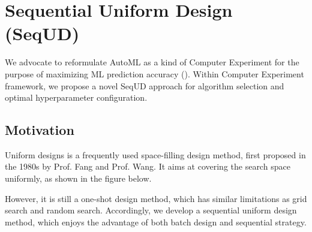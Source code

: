 \documentclass[letterpaper,10pt,english]{sphinxmanual}
\begin{document}
\begin{sphinxVerbatim}[commandchars=\\\{\}]
  
   
    

                    
 
\end{sphinxVerbatim}


\section{Sequential Uniform Design (SeqUD)}
\label{\detokenize{pysequd:sequential-uniform-design-sequd}}\label{\detokenize{pysequd::doc}}
We advocate to reformulate AutoML as a kind of Computer Experiment for the purpose of maximizing ML prediction accuracy ().
Within Computer Experiment framework, we propose a novel SeqUD approach for algorithm selection and optimal hyperparameter configuration.


\subsection{Motivation}
\label{\detokenize{pysequd:motivation}}
Uniform designs is a frequently used space-filling design method, first proposed in the 1980s by Prof. Fang and Prof. Wang. It aims at covering the search space uniformly, as shown in the figure below.


However, it is still a one-shot design method, which has similar limitations as grid search and random search. Accordingly, we develop a sequential uniform design method, which enjoys the advantage of both batch design and sequential strategy.
\end{document}
